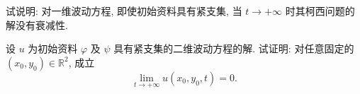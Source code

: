 \begin{exercise}
  试说明: 对一维波动方程, 即使初始资料具有紧支集,
  当 $t\to +\infty$ 时其柯西问题的解没有衰减性.
\end{exercise}



\begin{exercise}
  设 $u$ 为初始资料 $\varphi$ 及 $\psi$ 具有紧支集的二维波动方程的解.
  试证明: 对任意固定的 $(x_0,y_0)\in \mathbb{R}^2$, 成立
  \[\lim_{t\to+\infty} u(x_0,y_0,t) = 0.\]
\end{exercise}

